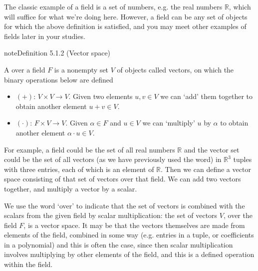 \documentclass[letterpaper,10pt,english]{jupyterBook}
\begin{document}
\sphinxAtStartPar
The classic example of a field is a set of numbers, e.g. the real numbers \(\mathbb{R}\), which will suffice for what we’re doing here. However, a field can be any set of objects for which the above definition is satisfied, and you may meet other examples of fields later in your studies.
\label{_pages/5.1_Vector_spaces_definitions:vector-space-definition}
\begin{sphinxadmonition}{note}{Definition 5.1.2 (Vector space)}



\sphinxAtStartPar
A  over a field \(F\) is a non\sphinxhyphen{}empty set \(V\) of objects called vectors, on which the binary operations below are defined
\begin{itemize}
\item {} 
\sphinxAtStartPar
{} \((+)\): \(V \times V \to V\). Given two elements \(u, v \in V\) we can ‘add’ them together to obtain another element \(u + v \in V\).

\item {} 
\sphinxAtStartPar
{} \((\cdot)\): \(F \times V \to V\). Given \(\alpha \in F\) and \(u \in V\) we can ‘multiply’ \(u\) by \(\alpha\) to obtain another element \(\alpha \cdot u \in V\).

\end{itemize}
\end{sphinxadmonition}

\sphinxAtStartPar
For example, a field could be the set of all real numbers \(\mathbb{R}\) and the vector set could be the set of all vectors (as we have previously used the word) in \(\mathbb{R}^3\) \sphinxhyphen{} tuples with three entries, each of which is an element of \(\mathbb{R}\). Then we can define a vector space consisting of that set of vectors over that field. We can add two vectors together, and multiply a vector by a scalar.

\sphinxAtStartPar
We use the word ‘over’ to indicate that the set of vectors is combined with the scalars from the given field by scalar multiplication: the set of vectors \(V\), over the field \(F\), is a vector space. It may be that the vectors themselves are made from elements of the field, combined in some way (e.g. entries in a tuple, or coefficients in a polynomial) \sphinxhyphen{} and this is often the case, since then scalar multiplication involves multiplying by other elements of the field, and this is a defined operation within the field.
\end{document}
